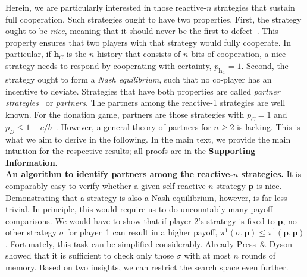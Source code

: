 \documentclass[11pt]{article}
\def\SI{\textbf{Supporting Information}}
\begin{document}
Herein, we are particularly interested in those reactive-$n$ strategies that sustain full cooperation. 
Such strategies ought to have two properties. 
First, the strategy ought to be {\it nice}, meaning that it should never be the first to defect~\citep{axelrod:AAAS:1981}.
This property ensures that two players with that strategy would fully cooperate. 
In particular, if $\mathbf{h}_C$ is the $n$-history that consists of $n$ bits of cooperation, a nice strategy needs to respond by cooperating with certainty, $p_{\mathbf{h}_C}\!=\!1$.  
Second, the strategy ought to form a {\it Nash equilibrium}, such that no co-player has an incentive to deviate. 
Strategies that have both properties are called {\it partner strategies}~\citep{Hilbe:GEB:2015} or {\it partners}.
The partners among the reactive-1 strategies are well known. 
For the donation game, partners are those strategies with $p_C\!=\!1$ and $p_D\!\le\!1\!-\!c/b$~\citep{akin:EGADS:2016}. 
However, a general theory of partners for $n\!\ge\!2$ is lacking. 
This is what we aim to derive in the following. 
In the main text, we provide the main intuition for the respective results; all proofs are in the \SI.\\
 

\noindent
\textbf{An algorithm to identify partners among the reactive-$n$ strategies.} 
It is comparably easy to verify whether a given self-reactive-$n$ strategy $\mathbf{p}$ is nice. 
Demonstrating that a strategy is also a Nash equilibrium, however, is far less trivial. 
In principle, this would require us to do uncountably many payoff comparisons. 
We would have to show that if player 2's strategy is fixed to $\mathbf{p}$, no other strategy $\sigma$ for player~1 can result in a higher payoff, $\pi^1(\sigma,\mathbf{p})\!\le\!\pi^1(\mathbf{p},\mathbf{p})$. 
Fortunately, this task can be simplified considerably. 
Already Press~\& Dyson~\cite{press:PNAS:2012} showed that it is sufficient to check only those $\sigma$ with at most $n$ rounds of memory. 
Based on two insights, we can restrict the search space even further. 
\end{document}
